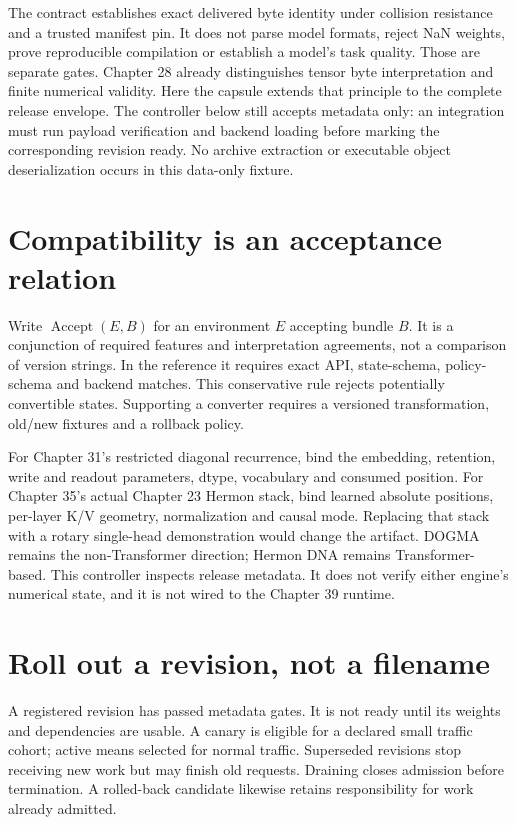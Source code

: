 The contract establishes exact delivered byte identity under collision resistance
and a trusted manifest pin. It does not parse model formats, reject NaN weights,
prove reproducible compilation or establish a model's task quality. Those are
separate gates. Chapter 28 already distinguishes tensor byte interpretation and
finite numerical validity. Here the capsule extends that principle to the
complete release envelope. The controller below still accepts metadata only:
an integration must run payload verification and backend loading before marking
the corresponding revision ready. No archive extraction or executable object
deserialization occurs in this data-only fixture.

\section{Compatibility is an acceptance relation}
\label{evod44:compat}
Write $\operatorname{Accept}(E,B)$ for an environment $E$ accepting bundle $B$.
It is a conjunction of required features and interpretation agreements, not
a comparison of version strings. In the reference it requires exact API,
state-schema, policy-schema and backend matches. This conservative rule
rejects potentially convertible states. Supporting a converter requires a
versioned transformation, old/new fixtures and a rollback policy.

For Chapter 31's restricted diagonal recurrence, bind the embedding, retention,
write and readout parameters, dtype, vocabulary and consumed position. For
Chapter 35's actual Chapter 23 Hermon stack, bind learned absolute positions,
per-layer K/V geometry, normalization and causal mode. Replacing that stack
with a rotary single-head demonstration would change the artifact. DOGMA
remains the non-Transformer direction; Hermon DNA remains Transformer-based.
This controller inspects release metadata. It does not verify either engine's
numerical state, and it is not wired to the Chapter 39 runtime.

\section{Roll out a revision, not a filename}
\label{evod44:rollout}
A registered revision has passed metadata gates. It is not ready until its
weights and dependencies are usable. A canary is eligible for a declared small
traffic cohort; active means selected for normal traffic. Superseded revisions
stop receiving new work but may finish old requests. Draining closes admission
before termination. A rolled-back candidate likewise retains responsibility
for work already admitted.

